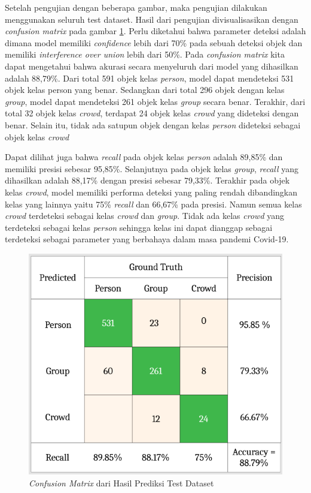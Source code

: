 Setelah pengujian dengan beberapa gambar, maka pengujian dilakukan menggunakan seluruh test dataset.
Hasil dari pengujian divisualisasikan dengan \textit{confusion matrix} pada gambar \ref{fig: Conf Matrix Test}.
Perlu diketahui bahwa parameter deteksi adalah dimana model memiliki \textit{confidence} lebih dari 
70\% pada sebuah deteksi objek dan memiliki \textit{interference over union} lebih dari 50\%. Pada
\textit{confusion matrix} kita dapat mengetahui bahwa akurasi secara menyeluruh dari model yang dihasilkan adalah 88,79\%. 
Dari total 591 objek kelas \textit{person}, model dapat mendeteksi 531 objek kelas person yang benar.
Sedangkan dari total 296 objek dengan kelas \textit{group}, model dapat mendeteksi 261 objek kelas 
\textit{group} secara benar. Terakhir, dari total 32 objek kelas \textit{crowd}, terdapat 24 objek
kelas \textit{crowd} yang dideteksi dengan benar. Selain itu, tidak ada satupun objek dengan kelas 
\textit{person} dideteksi sebagai objek kelas \textit{crowd}

Dapat dilihat juga bahwa \textit{recall} pada objek kelas \textit{person} adalah 89,85\% dan memiliki
presisi sebesar 95,85\%. Selanjutnya pada objek kelas \textit{group}, \textit{recall} yang dihasilkan
adalah 88,17\% dengan presisi sebesar 79,33\%. Terakhir pada objek kelas \textit{crowd}, model memiliki
performa deteksi yang paling rendah dibandingkan kelas yang lainnya yaitu 75\% \textit{recall} dan
66,67\% pada presisi. Namun semua kelas \textit{crowd} terdeteksi sebagai kelas \textit{crowd} dan
\textit{group}. Tidak ada kelas \textit{crowd} yang terdeteksi sebagai kelas \textit{person} sehingga
kelas ini dapat dianggap sebagai terdeteksi sebagai parameter yang berbahaya dalam masa pandemi Covid-19.

\begin{figure}[h!]
  \begin{center}
    \includegraphics[width= 0.5\linewidth]{bab4/Confusion Matrix.png}
    \caption{\textit{Confusion Matrix} dari Hasil Prediksi Test Dataset}
    \label{fig: Conf Matrix Test}
  \end{center}
\end{figure}
